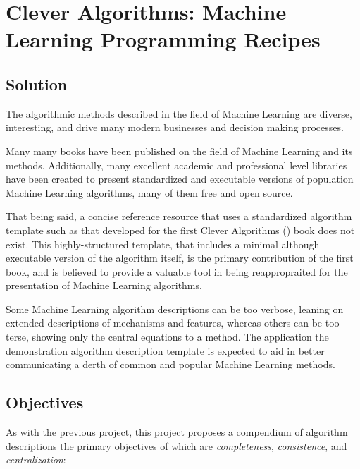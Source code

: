 \documentclass[a4paper, 11pt]{article}
\begin{document}
\section{Clever Algorithms: Machine Learning Programming Recipes}
\label{sec:project}

\subsection{Solution}
The algorithmic methods described in the field of Machine Learning are diverse, interesting, and drive many modern businesses and decision making processes. 

Many many books have been published on the field of Machine Learning and its methods. Additionally, many excellent academic and professional level libraries have been created to present standardized and executable versions of population Machine Learning algorithms, many of them free and open source. 

That being said, a concise reference resource that uses a standardized algorithm template such as that developed for the first Clever Algorithms (\cite{Brownlee2010a}) book does not exist. This highly-structured template, that includes a minimal although executable version of the algorithm itself, is the primary contribution of the first book, and is believed to provide a valuable tool in being reappropraited for the presentation of Machine Learning algorithms. 

Some Machine Learning algorithm descriptions can be too verbose, leaning on extended descriptions of mechanisms and features, whereas others can be too terse, showing only the central equations to a method. The application the demonstration algorithm description template is expected to aid in better communicating a derth of common and popular Machine Learning methods.

\subsection{Objectives}
As with the previous project, this project proposes a compendium of algorithm descriptions the primary objectives of which are \emph{completeness}, \emph{consistence}, and \emph{centralization}:
\end{document}
